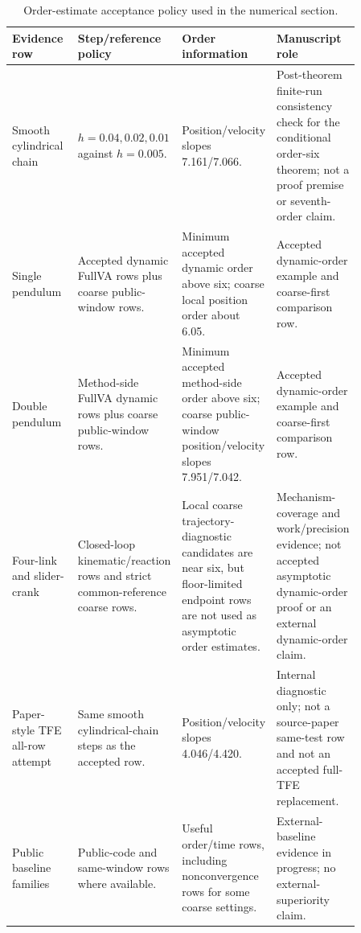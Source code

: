 \documentclass[preprint,12pt]{elsarticle}
\newcommand{\tfe}{TFE}
\begin{document}
\begin{table}[htbp]
\centering
\caption{Order-estimate acceptance policy used in the numerical section.}
\label{tab:order-acceptance-policy}
\scriptsize
\setlength{\tabcolsep}{3pt}
\begin{tabular}{P{0.22\linewidth}P{0.22\linewidth}P{0.19\linewidth}P{0.23\linewidth}}
\toprule
Evidence row & Step/reference policy & Order information & Manuscript role \\
\midrule
Smooth cylindrical chain &
$h=0.04,0.02,0.01$ against $h=0.005$. &
Position/velocity slopes 7.161/7.066. &
Post-theorem finite-run consistency check for the conditional order-six
theorem; not a proof premise or seventh-order claim. \\
Single pendulum &
Accepted dynamic FullVA rows plus coarse public-window rows. &
Minimum accepted dynamic order above six; coarse local position order about
6.05. &
Accepted dynamic-order example and coarse-first comparison row. \\
Double pendulum &
Method-side FullVA dynamic rows plus coarse public-window rows. &
Minimum accepted method-side order above six; coarse public-window
position/velocity slopes 7.951/7.042. &
Accepted dynamic-order example and coarse-first comparison row. \\
Four-link and slider-crank &
Closed-loop kinematic/reaction rows and strict common-reference coarse rows. &
Local coarse trajectory-diagnostic candidates are near six, but floor-limited
endpoint rows are not used as asymptotic order estimates. &
Mechanism-coverage and work/precision evidence; not accepted asymptotic
dynamic-order proof or an external dynamic-order claim. \\
Paper-style \tfe{} all-row attempt &
Same smooth cylindrical-chain steps as the accepted row. &
Position/velocity slopes 4.046/4.420. &
Internal diagnostic only; not a source-paper same-test row and not an
accepted full-\tfe{} replacement. \\
Public baseline families &
Public-code and same-window rows where available. &
Useful order/time rows, including nonconvergence rows for some coarse
settings. &
External-baseline evidence in progress; no external-superiority claim. \\
\bottomrule
\end{tabular}
\end{table}
\end{document}
